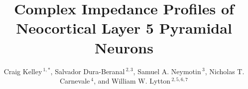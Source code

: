 \documentclass[utf8]{frontiersSCNS} %
\def\firstAuthorLast{Kelley {et~al.}} %
\def\Authors{Craig Kelley\,$^{1,*}$, Salvador Dura-Beranal\,$^{2,3}$, Samuel A. Neymotin\,$^{3}$, Nicholas T. Carnevale\,$^{4}$, and William W. Lytton\,$^{2,5,6,7}$}
\begin{document}
\onecolumn
{}

\title[Impedance Profiles of L5 Pyramidal Neurons]{Complex Impedance Profiles of Neocortical Layer 5 Pyramidal Neurons} 

\author[\firstAuthorLast ]{\Authors} %
\address{} %
\correspondance{} %
\extraAuth{}%
\maketitle
\end{document}
